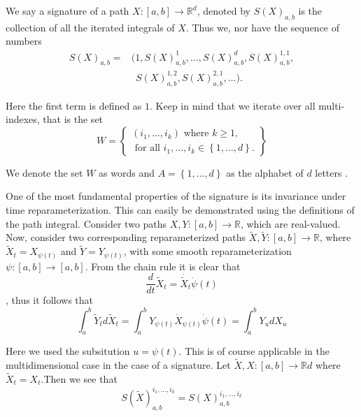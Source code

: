  \begin{definition}[Signature]
     We say a signature of a path $X: \left[ a,b \right] \to  \mathbb{R} ^{d} $, denoted by $S( X) _{a,b}$ is the collection of all the iterated integrals of $X$. Thus we, nor have the sequence of numbers \begin{equation}
     \begin{split}
         S( X) _{a,b}  = & ( 1,  S( X) ^{1}_{a,b}, \ldots, S( X) ^{d}_{a,b}, S( X) ^{1,1}_{a,b}, \\ & \ \  S( X) ^{1,2} _{a,b}, S( X) _{a,b}^{2,1}, \ldots).
     \end{split}
     \end{equation}

     Here the first term is defined as $1$. Keep in mind that we iterate over all multi-indexes, that is the set \begin{equation}
W =\left\{
         \begin{aligned}
           ( i_{1}, \ldots, i_{k})  \text{ where }  k \ge 1, \\
         \text{ for all } i_{1}, \ldots, i_{k} \in \left\{ 1,\ldots,d \right\} .
         \end{aligned}
\right\}
     \end{equation}

     We denote the set $W$ as words and $ A = \left\{ 1, \ldots, d \right\} $ as the alphabet of $d $ letters .
 \end{definition}


One of the most fundamental properties of the signature is its invariance under time reparameterization. This can easily be demonstrated using the definitions of the path integral. Consider two paths $X,Y: \left[ a,b \right] \to \mathbb{R}$, which
are real-valued. Now, consider two corresponding reparameterized paths $\widetilde{X}, \widetilde{Y}: \left[ a,b \right] \to \mathbb{R}$, where $\widetilde{X}_{t} = X_{\psi(t)}$ and $\widetilde{Y} = Y_{\psi(t)}$, with some smooth reparameterization $\psi: [a,b]
\to [a,b]$. From the chain rule it is clear that $$\frac{d}{dt} \widetilde{X}_{ t } = \dot{ \widetilde{X}_{ t }}  \dot{ \psi} ( t)  $$, thus it follows that \begin{equation}
    \int_{a}^{b }  \widetilde{Y}_{t} d\widetilde{X}_{t} = \int_{a}^{b}  Y_{\psi ( t) }\dot{X} _{\psi ( t) } \dot{\psi}( t) = \int_{a}^{b}  Y_{u} dX_{u}
\end{equation}

Here we used the subsitution $u = \psi ( t)  $. This is of course applicable in the multidimensional case in the case of a signature. Let $\widetilde{X},X: \left[ a,b \right] \to \mathbb{R} d$ where $\widetilde{X}_{t} = X_{t}$.Then we see that \begin{equation}
    S( \widetilde{X}) _{a,b}^{i_{1},\ldots, i_{k}} = S( X) ^{i_{1},\ldots, i_{k}}_{a,b}
\end{equation}

